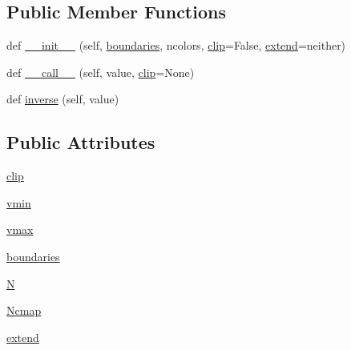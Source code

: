 \subsection*{Public Member Functions}
\begin{DoxyCompactItemize}
\item 
def \hyperlink{classmatplotlib_1_1colors_1_1BoundaryNorm_a91d672f60081a03a69d43427fabe394f}{\+\_\+\+\_\+init\+\_\+\+\_\+} (self, \hyperlink{classmatplotlib_1_1colors_1_1BoundaryNorm_a0d4490fe31a88486a0b7f974ca7bb000}{boundaries}, ncolors, \hyperlink{classmatplotlib_1_1colors_1_1BoundaryNorm_ab9464718150405d5cff2aa40bce4c66e}{clip}=False, \hyperlink{classmatplotlib_1_1colors_1_1BoundaryNorm_adea4ab245c880f8580022103b6ca1231}{extend}=\textquotesingle{}neither\textquotesingle{})
\item 
def \hyperlink{classmatplotlib_1_1colors_1_1BoundaryNorm_a23d05804e919befe676a8db4c35e840d}{\+\_\+\+\_\+call\+\_\+\+\_\+} (self, value, \hyperlink{classmatplotlib_1_1colors_1_1BoundaryNorm_ab9464718150405d5cff2aa40bce4c66e}{clip}=None)
\item 
def \hyperlink{classmatplotlib_1_1colors_1_1BoundaryNorm_aaf0d4594593def5e6c8be57b1666923e}{inverse} (self, value)
\end{DoxyCompactItemize}
\subsection*{Public Attributes}
\begin{DoxyCompactItemize}
\item 
\hyperlink{classmatplotlib_1_1colors_1_1BoundaryNorm_ab9464718150405d5cff2aa40bce4c66e}{clip}
\item 
\hyperlink{classmatplotlib_1_1colors_1_1BoundaryNorm_a29beedb7f317ef15f3aa6852ad0929d0}{vmin}
\item 
\hyperlink{classmatplotlib_1_1colors_1_1BoundaryNorm_adef68ce2dc3422143d667ba6b2a52291}{vmax}
\item 
\hyperlink{classmatplotlib_1_1colors_1_1BoundaryNorm_a0d4490fe31a88486a0b7f974ca7bb000}{boundaries}
\item 
\hyperlink{classmatplotlib_1_1colors_1_1BoundaryNorm_aa72a12a1bb1ce214b6cf488b82cc7bd8}{N}
\item 
\hyperlink{classmatplotlib_1_1colors_1_1BoundaryNorm_a8908386711e53c6b766018cd4a85277b}{Ncmap}
\item 
\hyperlink{classmatplotlib_1_1colors_1_1BoundaryNorm_adea4ab245c880f8580022103b6ca1231}{extend}
\end{DoxyCompactItemize}
